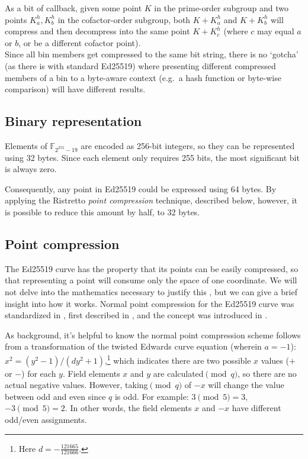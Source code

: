 As a bit of callback, given some point $K$ in the prime-order subgroup and two points $K^h_a, K^h_b$ in the cofactor-order subgroup, both $K + K^h_a$ and $K + K^h_b$ will compress and then decompress into the same point $K + K^h_c$ (where $c$ may equal $a$ or $b$, or be a different cofactor point).\\

Since all bin members get compressed to the same bit string, there is no `gotcha' (as there is with standard Ed25519) where presenting different compressed members of a bin to a byte-aware context (e.g.\ a hash function or byte-wise comparison) will have different results.


\subsection{Binary representation}
\label{subsec:binary_note}
Elements of \(\mathbb{F}_{2^{255} - 19} \) are encoded as 256-bit integers, so they can be represented using 32 bytes. Since each element only requires 255 bits, the most significant bit is always zero.

Consequently, any point in Ed25519 could be expressed using 64 bytes. By applying the Ristretto {\em point compression} technique, described below, however, it is possible to reduce this amount by half, to 32 bytes.


\subsection{Point compression}
\label{subsec:point-compression-section}

The Ed25519 curve has the property that its points can be easily compressed, so that representing a point will consume only the space of one coordinate. We will not delve into the mathematics necessary to justify this \cite{ristretto}, but we can give a brief insight into how it works. Normal point compression for the Ed25519 curve was standardized in \cite{eddsa-ed25519-irtf}, first described in \cite{Bernstein2012-high-speed-high-security-ed25519}, and the concept was introduced in \cite{Miller:point-compression-origin}.

As background, it's helpful to know the normal point compression scheme follows from a transformation of the twisted Edwards curve equation (wherein $a = -1$): $x^2 = (y^2-1)/(d y^2+1)$,\footnote{Here $d = - \frac{121665}{121666}$.} which indicates there are two possible $x$ values ($+$ or $-$) for each $y$. Field elements $x$ and $y$ are calculated$\pmod{q}$, so there are no actual negative values. However, taking$\pmod{q}$ of $-x$ will change the value between odd and even since $q$ is odd. For example: $3 \pmod{5} = 3$, $-3 \pmod{5} = 2$. In other words, the field elements $x$ and $-x$ have different odd/even assignments.

